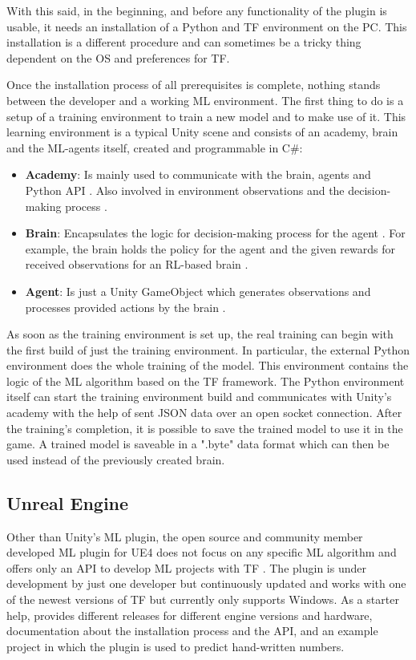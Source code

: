\documentclass[MGS,Master,english]{twbook}%
\begin{document}
With this said, in the beginning, and before any functionality of the plugin is usable, it needs an installation of a Python and \ac{TF} environment on the PC. This installation is a different procedure and can sometimes be a tricky thing dependent on the \ac{OS} and preferences for \ac{TF}.

Once the installation process of all prerequisites is complete, nothing stands between the developer and a working ML environment. The first thing to do is a setup of a training environment to train a new model and to make use of it. This learning environment is a typical Unity scene and consists of an academy, brain and the ML-agents itself, created and programmable in C\#:
\begin{itemize}
	\item \textbf{Academy}: Is mainly used to communicate with the brain, agents and Python API \cite{unity::mlGithub}. Also involved in environment observations and the decision-making process \cite{unity::mlGithub}. 
	\item \textbf{Brain}: Encapsulates the logic for decision-making process for the agent \cite{unity::mlGithub}. For example, the brain holds the policy for the agent and the given rewards for received observations for an RL-based brain \cite{unity::mlGithub}.
	\item \textbf{Agent}: Is just a Unity GameObject which generates observations and processes provided actions by the brain \cite{unity::mlGithub}.
\end{itemize}  
As soon as the training environment is set up, the real training can begin with the first build of just the training environment. In particular, the external Python environment does the whole training of the model. This environment contains the logic of the ML algorithm based on the \ac{TF} framework. The Python environment itself can start the training environment build and communicates with Unity’s academy with the help of sent \ac{JSON} data over an open socket connection. After the training's completion, it is possible to save the trained model to use it in the game. A trained model is saveable in a ".byte" data format which can then be used instead of the previously created brain.

\subsection{Unreal Engine}
Other than Unity’s ML plugin, the open source and community member developed ML plugin for \ac{UE4} does not focus on any specific ML algorithm and offers only an API to develop ML projects with \ac{TF} \cite{ue4::tensorFlowPlugin}. The plugin is under development by just one developer but continuously updated and works with one of the newest versions of \ac{TF} but currently only supports Windows. As a starter help, \citep{ue4::tensorFlowPlugin} provides different releases for different engine versions and hardware, documentation about the installation process and the API, and an example project in which the plugin is used to predict hand-written numbers.
\end{document}
